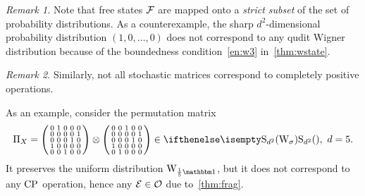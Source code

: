 \emph{Remark 1.} Note that free states $\mathcal{F}$ are mapped onto a \emph{strict subset} of the set of probability distributions.
As a counterexample, the sharp $d^2$-dimensional probability distribution $(1, 0, \dots, 0)$ does not correspond to any qudit Wigner distribution because of the boundedness condition~\ref{en:w3} in~\cref{thm:wstate}.

\emph{Remark 2.} Similarly, not all stochastic matrices correspond to completely positive operations.

As an example, consider the permutation matrix
\begin{equation}
    \Pi_X = \begin{psmallmatrix}
        0 & 1 & 0 & 0 & 0 \\
        0 & 0 & 0 & 0 & 1 \\
        0 & 0 & 0 & 1 & 0 \\
        1 & 0 & 0 & 0 & 0 \\
        0 & 0 & 1 & 0 & 0
    \end{psmallmatrix} \otimes \begin{psmallmatrix}
        0 & 0 & 1 & 0 & 0 \\
        0 & 0 & 0 & 0 & 1 \\
        0 & 0 & 0 & 1 & 0 \\
        1 & 0 & 0 & 0 & 0 \\
        0 & 1 & 0 & 0 & 0    
    \end{psmallmatrix} \in \stochw,\ d=5.
\end{equation}
It preserves the uniform distribution $\W{\frac{1}{5}\id}{}$, but it does not correspond to any ${\rm{CP}}$ operation, hence any $\mathcal{E} \in \mathcal{O}$ due to~\cref{thm:frag}.